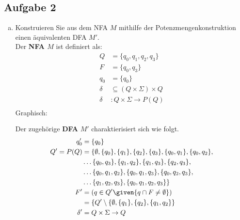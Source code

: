 \newpage

\subsection*{Aufgabe 2}

\begin{enumerate}[a)]

\item Konstruieren Sie aus dem NFA $M$ mithilfe der Potenzmengenkonstruktion einen äquivalenten DFA $M'$.\\
%

Der \textbf{NFA $M$} ist definiert als:
\begin{align*}
Q &= \{  q_0, q_1, q_2, q_3  \} \\
F &= \{ q_0, q_3  \} \\
q_0 &= \{ q_0  \} \\
\delta &\subseteq (Q \times \Sigma) \times Q \\
\delta &: Q \times \Sigma \to P(Q) \\
\end{align*}
%
Graphisch:\\
%
%
\newpage
%
Der zugehörige \textbf{DFA} $M'$ charaktierisiert sich wie folgt.\\
\begin{align*}
q'_{0} &= \{  q_0 \} \\
Q' = P(Q) &= \{ \emptyset, \{q_0\}, \{q_1\}, \{q_2\}, \{q_3\}, \{q_0, q_1\}, \{q_0, q_2\},\\
                         &\ldots  \{q_0, q_3\}, \{q_1, q_2\}, \{q_1, q_3\}, \{q_2, q_3\},\\
                         &\ldots  \{q_0, q_1, q_2\}, \{q_0, q_1, q_3\}, \{q_0, q_2, q_3\},\\
                         &\ldots  \{q_1, q_2, q_3\}, \{q_0, q_1, q_2, q_3\}   \} \\
F' &=  (q \in Q' \given{q \cap F \neq \emptyset} ) \\
       &=  \{  Q' \setminus \{\emptyset, \{q_1\}, \{q_2\}, \{q_1, q_2\}    \} \\
\delta' &= Q \times \Sigma \to Q \\
\end{align*}


\end{enumerate}
